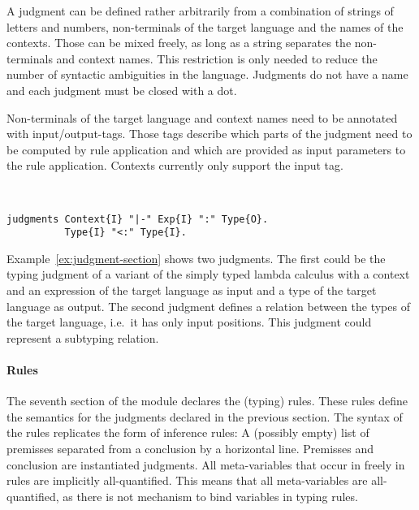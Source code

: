 A judgment can be defined rather arbitrarily from a combination of
strings of letters and numbers, non-terminals of the target language
and the names of the contexts. Those can be mixed freely, as long as a
string separates the non-terminals and context names. This restriction
is only needed to reduce the number of syntactic ambiguities in the
language. Judgments do not have a name and each judgment must be
closed with a dot.

Non-terminals of the target language and context names need to be
annotated with input/output-tags. Those tags describe which parts of
the judgment need to be computed by rule application and which are
provided as input parameters to the rule application. Contexts
currently only support the input tag.

\begin{example}{~}
\begin{verbatim}
judgments Context{I} "|-" Exp{I} ":" Type{O}.
          Type{I} "<:" Type{I}.
\end{verbatim}
\label{ex:judgment-section}
\end{example}

Example~\ref{ex:judgment-section} shows two judgments. The first could
be the typing judgment of a variant of the simply typed lambda
calculus with a context and an expression of the target language as
input and a type of the target language as output. The second judgment
defines a relation between the types of the target language, i.e.\ it
has only input positions. This judgment could represent a subtyping
relation.

\paragraph{Rules} The seventh section of the module declares the
(typing) rules. These rules define the semantics for the judgments
declared in the previous section. The syntax of the rules replicates
the form of inference rules: A (possibly empty) list of premisses
separated from a conclusion by a horizontal line. Premisses and
conclusion are instantiated judgments. All meta-variables that occur
in freely in rules are implicitly all-quantified. This means that all
meta-variables are all-quantified, as there is not mechanism to bind
variables in typing rules.

